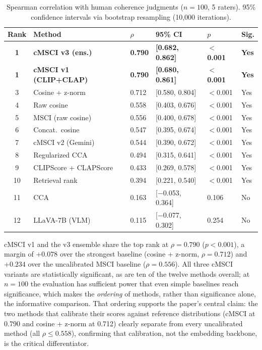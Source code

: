 \documentclass[a4paper,fleqn]{cas-sc}
\begin{document}
\begin{itemize}
\begin{table}[t]
\caption{Spearman correlation with human coherence judgments ($n = 100$, 5 raters). 95\% confidence intervals via bootstrap resampling (10,000 iterations).}\label{tab:main-comparison}
\centering
\small
\begin{tabular}{clllll}
\toprule
Rank & Method & $\rho$ & 95\% CI & $p$ & Sig. \\
\midrule
\textbf{1} & \textbf{cMSCI v3 (ens.)} & \textbf{0.790} & \textbf{[0.682, 0.862]} & \textbf{$<$0.001} & \textbf{Yes} \\
\textbf{1} & \textbf{cMSCI v1 (CLIP+CLAP)} & \textbf{0.790} & \textbf{[0.680, 0.861]} & \textbf{$<$0.001} & \textbf{Yes} \\
3 & Cosine + z-norm & 0.712 & [0.580, 0.804] & $<$0.001 & Yes \\
4 & Raw cosine & 0.558 & [0.403, 0.676] & $<$0.001 & Yes \\
5 & MSCI (raw cosine) & 0.556 & [0.400, 0.678] & $<$0.001 & Yes \\
6 & Concat.\ cosine & 0.547 & [0.395, 0.674] & $<$0.001 & Yes \\
7 & cMSCI v2 (Gemini) & 0.544 & [0.390, 0.672] & $<$0.001 & Yes \\
8 & Regularized CCA & 0.494 & [0.315, 0.641] & $<$0.001 & Yes \\
9 & CLIPScore + CLAPScore & 0.433 & [0.269, 0.578] & $<$0.001 & Yes \\
10 & Retrieval rank & 0.394 & [0.221, 0.540] & $<$0.001 & Yes \\
11 & CCA & 0.163 & [$-$0.053, 0.364] & 0.106 & No \\
12 & LLaVA-7B (VLM) & 0.115 & [$-$0.077, 0.302] & 0.254 & No \\
\bottomrule
\end{tabular}
\end{table}

cMSCI v1 and the v3 ensemble share the top rank at $\rho = 0.790$ ($p < 0.001$), a margin of $+0.078$ over the strongest baseline (cosine + z-norm, $\rho = 0.712$) and $+0.234$ over the uncalibrated MSCI baseline ($\rho = 0.556$). All three cMSCI variants are statistically significant, as are ten of the twelve methods overall; at $n = 100$ the evaluation has sufficient power that even simple baselines reach significance, which makes the \emph{ordering} of methods, rather than significance alone, the informative comparison. That ordering supports the paper's central claim: the two methods that calibrate their scores against reference distributions (cMSCI at 0.790 and cosine + z-norm at 0.712) clearly separate from every uncalibrated method (all $\rho \leq 0.558$), confirming that calibration, not the embedding backbone, is the critical differentiator.


\end{itemize}
\end{document}
